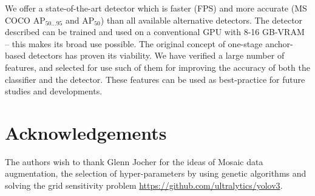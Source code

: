 \documentclass[10pt,twocolumn,letterpaper]{article}
\begin{document}
\vspace{-2mm}

We offer a state-of-the-art detector which is faster (FPS) and more accurate (MS COCO AP$_{50...95}$ and AP$_{50}$) than all available alternative detectors. The detector described can be trained and used on a conventional GPU with 8-16 GB-VRAM – this makes its broad use possible. The original concept of one-stage anchor-based detectors has proven its viability. We have verified a large number of features, and selected for use such of them for improving the accuracy of both the classifier and the detector. These features can be used as best-practice for future studies and developments.



\section{Acknowledgements}

\vspace{-2mm}

The authors wish to thank Glenn Jocher for the ideas of Mosaic data augmentation, the selection of hyper-parameters by using genetic algorithms and solving the grid sensitivity problem \url{https://github.com/ultralytics/yolov3}.

\end{document}
